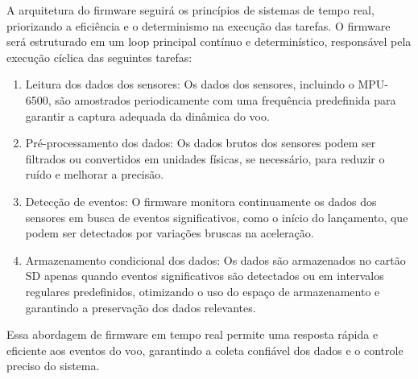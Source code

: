 A arquitetura do firmware seguirá os princípios de sistemas de tempo real, priorizando a eficiência e o determinismo na execução das tarefas. O firmware será estruturado em um loop principal contínuo e determinístico, responsável pela execução cíclica das seguintes tarefas:

\begin{enumerate}
    \item  Leitura dos dados dos sensores: Os dados dos sensores, incluindo o MPU-6500, são amostrados periodicamente com uma frequência predefinida para garantir a captura adequada da dinâmica do voo.
    \item  Pré-processamento dos dados: Os dados brutos dos sensores podem ser filtrados ou convertidos em unidades físicas, se necessário, para reduzir o ruído e melhorar a precisão.
    \item  Detecção de eventos: O firmware monitora continuamente os dados dos sensores em busca de eventos significativos, como o início do lançamento, que podem ser detectados por variações bruscas na aceleração.
    \item  Armazenamento condicional dos dados: Os dados são armazenados no cartão SD apenas quando eventos significativos são detectados ou em intervalos regulares predefinidos, otimizando o uso do espaço de armazenamento e garantindo a preservação dos dados relevantes.
\end{enumerate}

Essa abordagem de firmware em tempo real permite uma resposta rápida e eficiente aos eventos do voo, garantindo a coleta confiável dos dados e o controle preciso do sistema.

